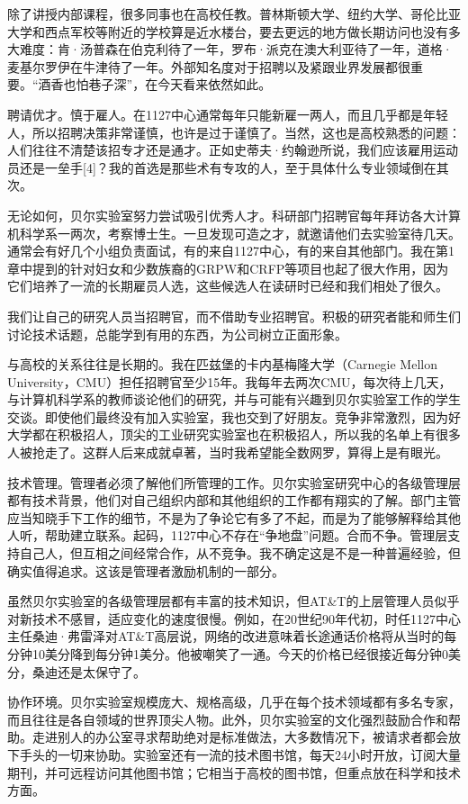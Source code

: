 \documentclass[a4paper,12pt,UTF8,twoside]{ctexbook}
\begin{document}
除了讲授内部课程，很多同事也在高校任教。普林斯顿大学、纽约大学、哥伦比亚大学和西点军校等附近的学校算是近水楼台，要去更远的地方做长期访问也没有多大难度：肯·汤普森在伯克利待了一年，罗布·派克在澳大利亚待了一年，道格·麦基尔罗伊在牛津待了一年。外部知名度对于招聘以及紧跟业界发展都很重要。“酒香也怕巷子深”，在今天看来依然如此。

聘请优才。慎于雇人。在1127中心通常每年只能新雇一两人，而且几乎都是年轻人，所以招聘决策非常谨慎，也许是过于谨慎了。当然，这也是高校熟悉的问题：人们往往不清楚该招专才还是通才。正如史蒂夫·约翰逊所说，我们应该雇用运动员还是一垒手[4]？我的首选是那些术有专攻的人，至于具体什么专业领域倒在其次。

无论如何，贝尔实验室努力尝试吸引优秀人才。科研部门招聘官每年拜访各大计算机科学系一两次，考察博士生。一旦发现可造之才，就邀请他们去实验室待几天。通常会有好几个小组负责面试，有的来自1127中心，有的来自其他部门。我在第1章中提到的针对妇女和少数族裔的GRPW和CRFP等项目也起了很大作用，因为它们培养了一流的长期雇员人选，这些候选人在读研时已经和我们相处了很久。

我们让自己的研究人员当招聘官，而不借助专业招聘官。积极的研究者能和师生们讨论技术话题，总能学到有用的东西，为公司树立正面形象。

与高校的关系往往是长期的。我在匹兹堡的卡内基梅隆大学（Carnegie Mellon University，CMU）担任招聘官至少15年。我每年去两次CMU，每次待上几天，与计算机科学系的教师谈论他们的研究，并与可能有兴趣到贝尔实验室工作的学生交谈。即使他们最终没有加入实验室，我也交到了好朋友。竞争非常激烈，因为好大学都在积极招人，顶尖的工业研究实验室也在积极招人，所以我的名单上有很多人被抢走了。这群人后来成就卓著，当时我希望能全数网罗，算得上是有眼光。

技术管理。管理者必须了解他们所管理的工作。贝尔实验室研究中心的各级管理层都有技术背景，他们对自己组织内部和其他组织的工作都有翔实的了解。部门主管应当知晓手下工作的细节，不是为了争论它有多了不起，而是为了能够解释给其他人听，帮助建立联系。起码，1127中心不存在“争地盘”问题。合而不争。管理层支持自己人，但互相之间经常合作，从不竞争。我不确定这是不是一种普遍经验，但确实值得追求。这该是管理者激励机制的一部分。

虽然贝尔实验室的各级管理层都有丰富的技术知识，但AT\&T的上层管理人员似乎对新技术不感冒，适应变化的速度很慢。例如，在20世纪90年代初，时任1127中心主任桑迪·弗雷泽对AT\&T高层说，网络的改进意味着长途通话价格将从当时的每分钟10美分降到每分钟1美分。他被嘲笑了一通。今天的价格已经很接近每分钟0美分，桑迪还是太保守了。

协作环境。贝尔实验室规模庞大、规格高级，几乎在每个技术领域都有多名专家，而且往往是各自领域的世界顶尖人物。此外，贝尔实验室的文化强烈鼓励合作和帮助。走进别人的办公室寻求帮助绝对是标准做法，大多数情况下，被请求者都会放下手头的一切来协助。实验室还有一流的技术图书馆，每天24小时开放，订阅大量期刊，并可远程访问其他图书馆；它相当于高校的图书馆，但重点放在科学和技术方面。
\end{document}
